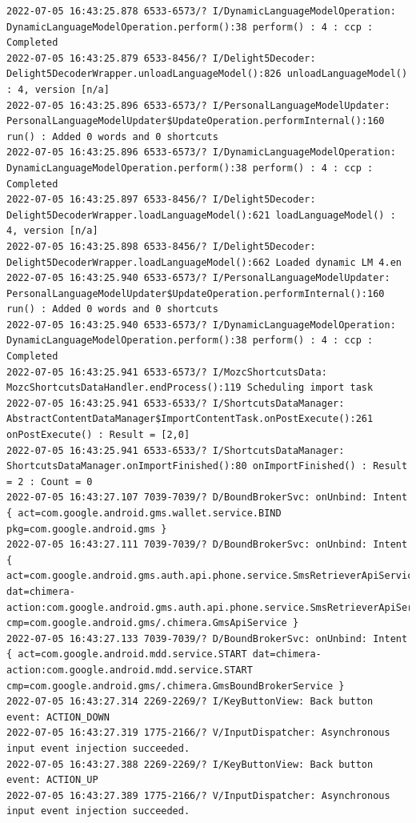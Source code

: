 \documentclass[a4paper,12pt]{book}
\begin{document}
\begin{lstlisting}
2022-07-05 16:43:25.878 6533-6573/? I/DynamicLanguageModelOperation: DynamicLanguageModelOperation.perform():38 perform() : 4 : ccp : Completed
2022-07-05 16:43:25.879 6533-8456/? I/Delight5Decoder: Delight5DecoderWrapper.unloadLanguageModel():826 unloadLanguageModel() : 4, version [n/a]
2022-07-05 16:43:25.896 6533-6573/? I/PersonalLanguageModelUpdater: PersonalLanguageModelUpdater$UpdateOperation.performInternal():160 run() : Added 0 words and 0 shortcuts
2022-07-05 16:43:25.896 6533-6573/? I/DynamicLanguageModelOperation: DynamicLanguageModelOperation.perform():38 perform() : 4 : ccp : Completed
2022-07-05 16:43:25.897 6533-8456/? I/Delight5Decoder: Delight5DecoderWrapper.loadLanguageModel():621 loadLanguageModel() : 4, version [n/a]
2022-07-05 16:43:25.898 6533-8456/? I/Delight5Decoder: Delight5DecoderWrapper.loadLanguageModel():662 Loaded dynamic LM 4.en
2022-07-05 16:43:25.940 6533-6573/? I/PersonalLanguageModelUpdater: PersonalLanguageModelUpdater$UpdateOperation.performInternal():160 run() : Added 0 words and 0 shortcuts
2022-07-05 16:43:25.940 6533-6573/? I/DynamicLanguageModelOperation: DynamicLanguageModelOperation.perform():38 perform() : 4 : ccp : Completed
2022-07-05 16:43:25.941 6533-6573/? I/MozcShortcutsData: MozcShortcutsDataHandler.endProcess():119 Scheduling import task
2022-07-05 16:43:25.941 6533-6533/? I/ShortcutsDataManager: AbstractContentDataManager$ImportContentTask.onPostExecute():261 onPostExecute() : Result = [2,0]
2022-07-05 16:43:25.941 6533-6533/? I/ShortcutsDataManager: ShortcutsDataManager.onImportFinished():80 onImportFinished() : Result = 2 : Count = 0
2022-07-05 16:43:27.107 7039-7039/? D/BoundBrokerSvc: onUnbind: Intent { act=com.google.android.gms.wallet.service.BIND pkg=com.google.android.gms }
2022-07-05 16:43:27.111 7039-7039/? D/BoundBrokerSvc: onUnbind: Intent { act=com.google.android.gms.auth.api.phone.service.SmsRetrieverApiService.START dat=chimera-action:com.google.android.gms.auth.api.phone.service.SmsRetrieverApiService.START cmp=com.google.android.gms/.chimera.GmsApiService }
2022-07-05 16:43:27.133 7039-7039/? D/BoundBrokerSvc: onUnbind: Intent { act=com.google.android.mdd.service.START dat=chimera-action:com.google.android.mdd.service.START cmp=com.google.android.gms/.chimera.GmsBoundBrokerService }
2022-07-05 16:43:27.314 2269-2269/? I/KeyButtonView: Back button event: ACTION_DOWN
2022-07-05 16:43:27.319 1775-2166/? V/InputDispatcher: Asynchronous input event injection succeeded.
2022-07-05 16:43:27.388 2269-2269/? I/KeyButtonView: Back button event: ACTION_UP
2022-07-05 16:43:27.389 1775-2166/? V/InputDispatcher: Asynchronous input event injection succeeded.

\end{lstlisting}
\end{document}
